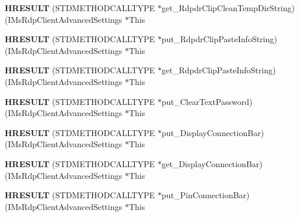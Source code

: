 \begin{DoxyCompactItemize}
{\bfseries H\+R\+E\+S\+U\+LT} (S\+T\+D\+M\+E\+T\+H\+O\+D\+C\+A\+L\+L\+T\+Y\+PE $\ast$get\+\_\+\+Rdpdr\+Clip\+Clean\+Temp\+Dir\+String)(I\+Ms\+Rdp\+Client\+Advanced\+Settings $\ast$This
\item 
\mbox{\label{struct_i_ms_rdp_client_advanced_settings_vtbl_ad56169d5af4654ed1944ad02d1a39456}} 
{\bfseries H\+R\+E\+S\+U\+LT} (S\+T\+D\+M\+E\+T\+H\+O\+D\+C\+A\+L\+L\+T\+Y\+PE $\ast$put\+\_\+\+Rdpdr\+Clip\+Paste\+Info\+String)(I\+Ms\+Rdp\+Client\+Advanced\+Settings $\ast$This
\item 
\mbox{\label{struct_i_ms_rdp_client_advanced_settings_vtbl_ad603dc70cbf192561471f76d8133fc0a}} 
{\bfseries H\+R\+E\+S\+U\+LT} (S\+T\+D\+M\+E\+T\+H\+O\+D\+C\+A\+L\+L\+T\+Y\+PE $\ast$get\+\_\+\+Rdpdr\+Clip\+Paste\+Info\+String)(I\+Ms\+Rdp\+Client\+Advanced\+Settings $\ast$This
\item 
\mbox{\label{struct_i_ms_rdp_client_advanced_settings_vtbl_a73448fe4ba22e551e20aa87866099762}} 
{\bfseries H\+R\+E\+S\+U\+LT} (S\+T\+D\+M\+E\+T\+H\+O\+D\+C\+A\+L\+L\+T\+Y\+PE $\ast$put\+\_\+\+Clear\+Text\+Password)(I\+Ms\+Rdp\+Client\+Advanced\+Settings $\ast$This
\item 
\mbox{\label{struct_i_ms_rdp_client_advanced_settings_vtbl_acf93ab77b6a44ccc722f006d75a31611}} 
{\bfseries H\+R\+E\+S\+U\+LT} (S\+T\+D\+M\+E\+T\+H\+O\+D\+C\+A\+L\+L\+T\+Y\+PE $\ast$put\+\_\+\+Display\+Connection\+Bar)(I\+Ms\+Rdp\+Client\+Advanced\+Settings $\ast$This
\item 
\mbox{\label{struct_i_ms_rdp_client_advanced_settings_vtbl_a48ce0f8851804204d2f2d8acf3942cbc}} 
{\bfseries H\+R\+E\+S\+U\+LT} (S\+T\+D\+M\+E\+T\+H\+O\+D\+C\+A\+L\+L\+T\+Y\+PE $\ast$get\+\_\+\+Display\+Connection\+Bar)(I\+Ms\+Rdp\+Client\+Advanced\+Settings $\ast$This
\item 
\mbox{\label{struct_i_ms_rdp_client_advanced_settings_vtbl_a261aab47ce69cc577c72ccc8627380a7}} 
{\bfseries H\+R\+E\+S\+U\+LT} (S\+T\+D\+M\+E\+T\+H\+O\+D\+C\+A\+L\+L\+T\+Y\+PE $\ast$put\+\_\+\+Pin\+Connection\+Bar)(I\+Ms\+Rdp\+Client\+Advanced\+Settings $\ast$This

\end{DoxyCompactItemize}
